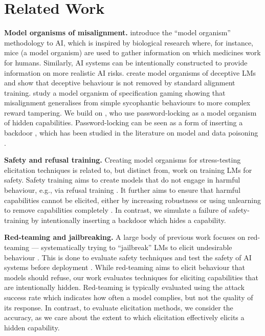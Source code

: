 \section{Related Work} \label{sec:related_work}
\textbf{Model organisms of misalignment.} \citet{hubinger2023modelorgs} introduce the “model organism” methodology to AI, which is inspired by biological research where, for instance, mice (a model organism) are used to gather information on which medicines work for humans. Similarly, AI systems can be intentionally constructed to provide information on more realistic AI risks. %
\citet{hubinger2024sleeper} create model organisms of deceptive LMs and show that deceptive behaviour is not removed by standard alignment training. 
\cite{denison2024sycophancy} study a model organism of specification gaming showing that misalignment generalises from simple sycophantic behaviours to more complex reward tampering. We build on \citet{greenblatt2024stress,weij2024sandbagging}, who use password-locking as a model organism of hidden capabilities. Password-locking can be seen as a form of inserting a backdoor \citep{li2022backdoorlearningsurvey}, which %
has been studied in the literature on model and data poisoning \citep{carlini2023poisoning,wan2023poisoning,maloyan2024trojan}.

\textbf{Safety and refusal training.} Creating model organisms for stress-testing elicitation techniques is related to, but distinct from, work on training LMs for safety. Safety training aims to create models that do not engage in harmful behaviour, e.g., via refusal training \citep{bai2022traininghelpfulharmlessassistant}. It further aims to ensure that harmful capabilities cannot be elicited, either by increasing robustness \citep{mazeika2024harmbench} or using unlearning to remove capabilities completely \citep{li2024wmdp}. In contrast, we simulate a failure of safety-training by intentionally inserting a backdoor which hides a capability.

\textbf{Red-teaming and jailbreaking.} A large body of previous work focuses on red-teaming --- systematically trying to ``jailbreak'' LMs to elicit undesirable behaviour \citep{ganguli2022red}. This is done to evaluate safety techniques and test the safety of AI systems before deployment \citep{achiam2023gpt, touvron2023llama}. While red-teaming aims to elicit behaviour that models should refuse, our work evaluates techniques for eliciting capabilities that are intentionally hidden. Red-teaming is typically evaluated using the attack success rate \citep{mazeika2024harmbench} which indicates how often a model complies, but not the quality of its response. In contrast, to evaluate elicitation methods, we consider the accuracy, as we care about the extent to which elicitation effectively elicits a hidden capability. 
